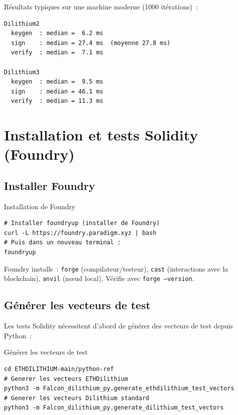 \documentclass[12pt, a4paper]{article}
\begin{document}
\begin{successbox}
Résultats typiques sur une machine moderne (1000 itérations)~:
\begin{lstlisting}[style=output]
Dilithium2
  keygen  : median =  6.2 ms
  sign    : median = 27.4 ms  (moyenne 27.8 ms)
  verify  : median =  7.1 ms

Dilithium3
  keygen  : median =  9.5 ms
  sign    : median = 46.1 ms
  verify  : median = 11.3 ms
\end{lstlisting}
\end{successbox}

\section{Installation et tests Solidity (Foundry)}

\subsection{Installer Foundry}

\begin{cmdbox}{Installation de Foundry}
\begin{lstlisting}[style=bash]
# Installer foundryup (installer de Foundry)
curl -L https://foundry.paradigm.xyz | bash
# Puis dans un nouveau terminal :
foundryup
\end{lstlisting}
\end{cmdbox}

\begin{infobox}
Foundry installe~: \texttt{forge} (compilateur/testeur),
\texttt{cast} (interactions avec la blockchain),
\texttt{anvil} (nœud local).
Vérifie avec \texttt{forge --version}.
\end{infobox}

\subsection{Générer les vecteurs de test}

Les tests Solidity nécessitent d'abord de générer des vecteurs de test
depuis Python~:

\begin{cmdbox}{Générer les vecteurs de test}
\begin{lstlisting}[style=bash]
cd ETHDILITHIUM-main/python-ref
# Generer les vecteurs ETHDilithium
python3 -m Falcon_dilithium_py.generate_ethdilithium_test_vectors
# Generer les vecteurs Dilithium standard
python3 -m Falcon_dilithium_py.generate_dilithium_test_vectors
\end{lstlisting}
\end{cmdbox}
\end{document}
